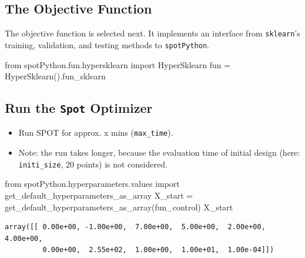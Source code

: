 \documentclass[
  letterpaper,
  DIV=11,
  numbers=noendperiod]{scrreprt}
\newenvironment{Shaded}{\begin{snugshade}}{\end{snugshade}}
\newcommand{\ImportTok}[1]{\textcolor[rgb]{0.00,0.46,0.62}{#1}}
\newcommand{\NormalTok}[1]{\textcolor[rgb]{0.00,0.23,0.31}{#1}}
\newcommand{\OperatorTok}[1]{\textcolor[rgb]{0.37,0.37,0.37}{#1}}
\providecommand{\tightlist}{%
  \setlength{\itemsep}{0pt}\setlength{\parskip}{0pt}}\usepackage{longtable,booktabs,array}
\begin{document}
\hypertarget{sec-the-objective-function-17}{%
\subsection{The Objective
Function}\label{sec-the-objective-function-17}}

The objective function is selected next. It implements an interface from
\texttt{sklearn}'s training, validation, and testing methods to
\texttt{spotPython}.

\begin{Shaded}
\begin{Highlighting}[]
\ImportTok{from}\NormalTok{ spotPython.fun.hypersklearn }\ImportTok{import}\NormalTok{ HyperSklearn}
\NormalTok{fun }\OperatorTok{=}\NormalTok{ HyperSklearn().fun\_sklearn}
\end{Highlighting}
\end{Shaded}

\hypertarget{run-the-spot-optimizer-3}{%
\subsection{\texorpdfstring{Run the \texttt{Spot}
Optimizer}{Run the Spot Optimizer}}\label{run-the-spot-optimizer-3}}

\begin{itemize}
\tightlist
\item
  Run SPOT for approx. x mins (\texttt{max\_time}).
\item
  Note: the run takes longer, because the evaluation time of initial
  design (here: \texttt{initi\_size}, 20 points) is not considered.
\end{itemize}

\begin{Shaded}
\begin{Highlighting}[]
\ImportTok{from}\NormalTok{ spotPython.hyperparameters.values }\ImportTok{import}\NormalTok{ get\_default\_hyperparameters\_as\_array}
\NormalTok{X\_start }\OperatorTok{=}\NormalTok{ get\_default\_hyperparameters\_as\_array(fun\_control)}
\NormalTok{X\_start}
\end{Highlighting}
\end{Shaded}

\begin{verbatim}
array([[ 0.00e+00, -1.00e+00,  7.00e+00,  5.00e+00,  2.00e+00,  4.00e+00,
         0.00e+00,  2.55e+02,  1.00e+00,  1.00e+01,  1.00e-04]])
\end{verbatim}
\end{document}
